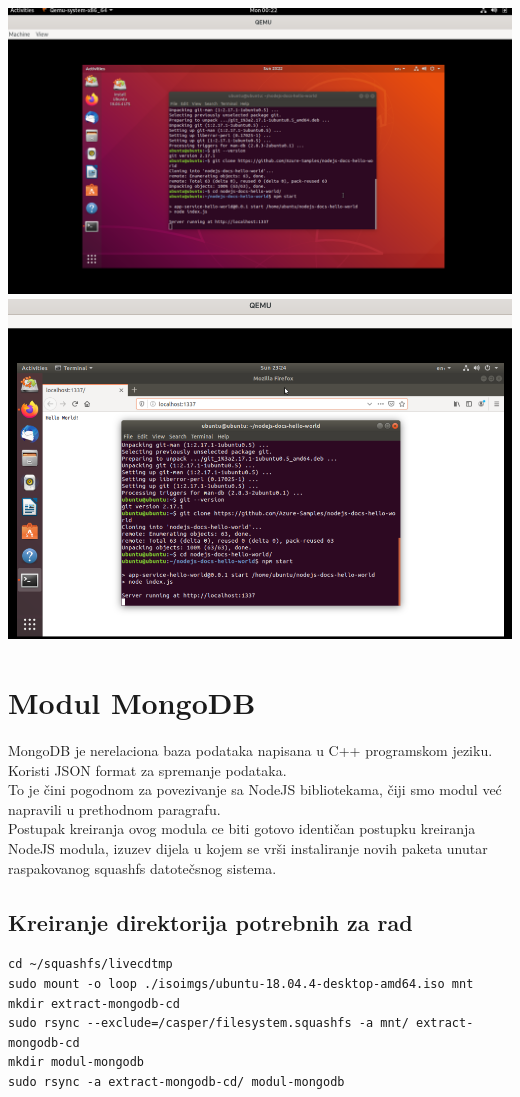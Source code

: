 \documentclass[12pt,vi]{mitthesis}
\begin{document}
\includegraphics[width=\linewidth]{images/ModulNodeJSUbuntuTerminal.png}\\
\includegraphics[width=\linewidth]{images/ModulNodeJSUbuntu1.png} 
\newpage
\section*{Modul MongoDB}
MongoDB je nerelaciona baza podataka napisana u C++ programskom jeziku. Koristi JSON format za spremanje podataka.\\
To je čini pogodnom za povezivanje sa NodeJS bibliotekama, čiji smo modul već napravili u prethodnom paragrafu.\\
Postupak kreiranja ovog modula ce biti gotovo identičan postupku kreiranja NodeJS modula, izuzev dijela u kojem se vrši instaliranje novih paketa unutar raspakovanog squashfs datotečsnog sistema.\\

\subsection*{Kreiranje direktorija potrebnih za rad}
\begin{lstlisting}[style=BashInputStyle]
cd ~/squashfs/livecdtmp
sudo mount -o loop ./isoimgs/ubuntu-18.04.4-desktop-amd64.iso mnt
mkdir extract-mongodb-cd
sudo rsync --exclude=/casper/filesystem.squashfs -a mnt/ extract-mongodb-cd
mkdir modul-mongodb
sudo rsync -a extract-mongodb-cd/ modul-mongodb
\end{lstlisting}
\end{document}
